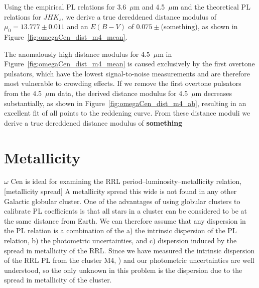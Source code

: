 \documentclass[a4paper,fleqn,usenatbib]{mnras}
\begin{document}
Using the empirical PL relations for 3.6~$\mu$m and 4.5~$\mu$m and the theoretical PL relations for $J\!H\!K_s$, we derive a true dereddened distance modulus of $\mu_0 = 13.777 \pm 0.011$ and an $E(B-V)$ of $0.075 \pm $(something), as shown in Figure~\ref{fig:omegaCen_dist_m4_mean}.

The anomalously high distance modulus for 4.5~$\mu$m in Figure~\ref{fig:omegaCen_dist_m4_mean} is caused exclusively by the first overtone pulsators, which have the lowest signal-to-noise measurements and are therefore most vulnerable to crowding effects. If we remove the first overtone pulsators from the 4.5~$\mu$m data, the derived distance modulus for 4.5~$\mu$m decreases substantially, as shown in Figure~\ref{fig:omegaCen_dist_m4_ab}, resulting in an excellent fit of all points to the reddening curve. From these distance moduli we derive a true dereddened distance modulus of \textbf{something} %

\section{Metallicity}
\label{sec:metallicity}

$\omega$ Cen is ideal for examining the RRL period--luminosity--metallicity relation, [metallicity spread]%
A metallicity spread this wide is not found in any other Galactic globular cluster. One of the advantages of using globular clusters to calibrate PL coefficients is that all stars in a cluster can be considered to be at the same distance from Earth. We can therefore assume that any dispersion in the PL relation is a combination of the a) the intrinsic dispersion of the PL relation, b) the photometric uncertainties, and c) dispersion induced by the spread in metallicity of the RRL. Since we have measured the intrinsic dispersion of the RRL PL from the cluster M4, \citet{2015arXiv150507858N}) and our photometric uncertainties are well understood, so the only unknown in this problem is the dispersion due to the spread in metallicity of the cluster. 
\end{document}
